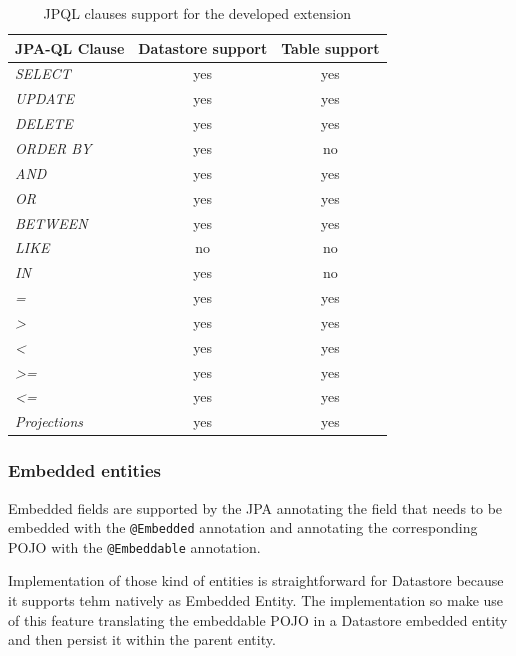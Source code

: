 \begin{table}[p]
\centering
\begin{tabular}{|l|c|c|}
\hline
\textbf{JPA-QL Clause} & \textbf{Datastore support} & \textbf{Table support}\\ 
\hline\hline
\textit{SELECT}        & yes 	& yes 	\\ \hline
\textit{UPDATE}        & yes 	& yes 	\\ \hline
\textit{DELETE}        & yes 	& yes 	\\ \hline
\textit{ORDER BY}      & yes 	& no 	\\ \hline
\textit{AND}           & yes 	& yes 	\\ \hline
\textit{OR}            & yes 	& yes 	\\ \hline
\textit{BETWEEN}       & yes 	& yes 	\\ \hline
\textit{LIKE}          & no  	& no  	\\ \hline
\textit{IN}            & yes  	& no  	\\ \hline
\textit{=}             & yes 	& yes 	\\ \hline
\textit{\textgreater}  & yes  	& yes 	\\ \hline
\textit{\textless}     & yes 	& yes 	\\ \hline
\textit{\textgreater=} & yes 	& yes 	\\ \hline
\textit{\textless=}    & yes  	& yes 	\\ \hline
\textit{Projections}   & yes  	& yes 	\\ \hline
\end{tabular}
\caption{JPQL clauses support for the developed extension}
\label{table:queries}
\end{table}

\subsubsection{Embedded entities}
Embedded fields are supported by the JPA \cite{book:projpa2} annotating the field that needs to be embedded with the \texttt{@Embedded} annotation and annotating the corresponding POJO with the \texttt{@Embeddable} annotation.

\newparagraph Implementation of those kind of entities is straightforward for Datastore because it supports tehm natively as Embedded Entity.
\noindent The implementation so make use of this feature translating the embeddable POJO in a Datastore embedded entity and then persist it within the parent entity.

